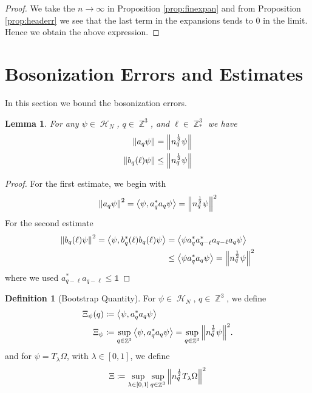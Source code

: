 \documentclass[sn-mathphys, Numbered ,a4paper]{sn-jnl}%
\DeclareMathOperator{\Z}{\mathbb{Z}}
\DeclareMathOperator{\HH}{\mathcal{H}}
\newcommand{\half}{\frac{1}{2}}
\newcommand{\eva}[1]{\left\langle #1 \right\rangle}
\theoremstyle{plain}
\newtheorem{lemma}[theorem]{Lemma}
\theoremstyle{definition}
\newtheorem{definition}[theorem]{Definition}
\theoremstyle{remark}
\theoremstyle{plain}
\theoremstyle{definition}
\theoremstyle{remark}
\begin{document}
\begin{proof}
    We take the $n\rightarrow \infty$ in Proposition \ref{prop:finexpan} and from Proposition \ref{prop:headerr} we see that the last term in the expansions tends to $0$ in the limit. Hence we obtain the above expression.
\end{proof}
\section{Bosonization Errors and Estimates}
In this section we bound the bosonization errors.
\begin{lemma}
	For any $\psi \in \HH_N$, $q \in \Z^3$, and $\ell \in \Z^3_*$ we have 
	\begin{align}
		\norm{a_q\psi}&= \norm{n_q^\half\psi} \\
		\norm{b_q(\ell)\psi}&\leq \norm{n_q^\half\psi}
	\end{align}
\end{lemma}
\begin{proof}
	For the first estimate, we begin with
	\begin{equation}
		\norm{a_q\psi}^2=\eva{\psi,a^*_q a_q\psi}=\norm{n_q^\half\psi}^2
	\end{equation}
For the second estimate
	\begin{align}
		\norm{b_q(\ell)\psi}^2=\eva{\psi,b^*_q(\ell) b_q(\ell)\psi} &=\eva{\psi a^*_q a^*_{q-\ell} a_{q-\ell} a_q\psi}\nonumber\\
		&\leq \eva{\psi a^*_q a_q\psi} = \norm{n_q^\half\psi}^2
	\end{align}
where we used $a^*_{q-\ell}a_{q-\ell}\leq \mathds{1}$ 
\end{proof}
\begin{definition}[Bootstrap Quantity]
 For  $\psi \in \HH_N$, $q\in \Z^3$, we define 
    \begin{align}
        \Xi_{\psi}(q) &\coloneq \expval{\psi, a^*_qa_q\psi}\\
        \Xi_{\psi} &\coloneq \sup\limits_{q \in \Z^3}\expval{\psi, a^*_qa_q\psi} = \sup\limits_{q \in \Z^3}\norm{n_q^\half \psi}^2.
    \end{align}
and for $\psi =T_{\lambda}\Omega$, with $\lambda \in [0,1]$, we define
\begin{equation}
	\Xi \coloneq \sup\limits_{\lambda \in [0,1]} \sup\limits_{q \in \Z^3} \norm{n_q^\half T_{\lambda}\Omega}^2
\end{equation}
\end{definition}
\end{document}
